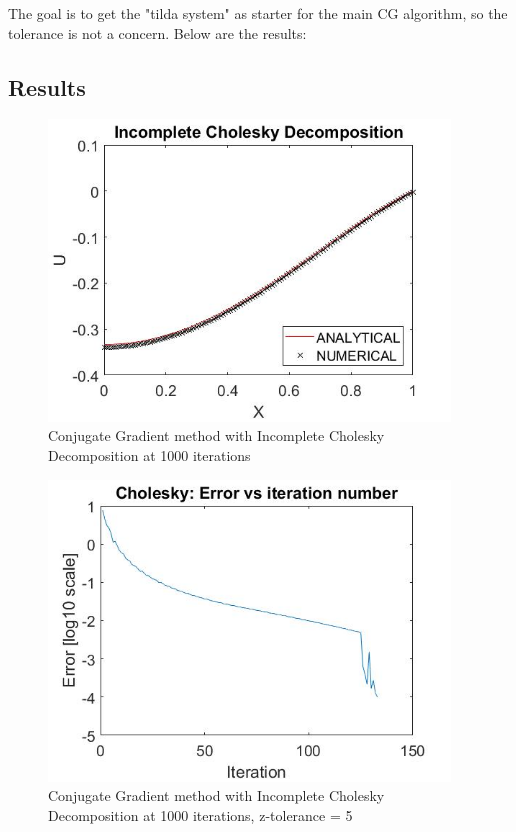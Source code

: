 \documentclass{article}
\begin{document}
\noindent
The goal is to get the "tilda system" as starter for the main CG algorithm, so the tolerance is not a concern. Below are the results: 


\subsection{Results}


\begin{figure}[H]
	\includegraphics[width=\linewidth,height=80mm]{Cholesky_cg5.jpg}
	\caption{Conjugate Gradient method with Incomplete Cholesky Decomposition at 1000 iterations}	
\end{figure}


\begin{figure}[H]
	\includegraphics[width=\linewidth,height=80mm]{Cholesky_error_cg5.jpg}
	\caption{Conjugate Gradient method with Incomplete Cholesky Decomposition at 1000 iterations, z-tolerance = 5}	
\end{figure}
\end{document}
